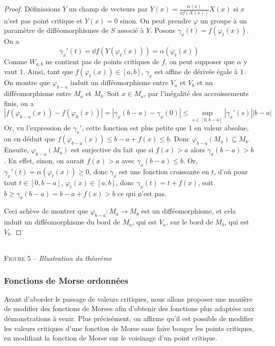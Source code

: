 \begin{proof}
    Définissions $Y$ un champ de vecteurs par $Y(x)=\frac{\alpha(x)}{\dd f(X(x))}X(x)$ si 
    $x$ n'est pas point critique et $Y(x)=0$ sinon.
    On peut prendre $\varphi$ un groupe à un paramètre de difféomorphismes de $S$ associé à 
    $Y$. 
    Posons $\gamma_x(t)=f(\varphi_t(x))$.
    On a 
    \[
        \gamma_x'(t)=\dd f(Y(\varphi_t(x)))=\alpha(\varphi_t(x))
    \]
    Comme $W_{a,b}$ ne contient pas de points critiques de $f$, on peut supposer que $\alpha$ 
    y vaut $1$.
    Ainsi, tant que $f(\varphi_t(x))\in[a,b]$, $\gamma_x$ est affine de dérivée égale à $1$.
    On montre que $\varphi_{b-a}$ induit un difféomorphisme entre $V_a$ et $V_b$ et un 
    difféomorphisme entre $M_a$ et $M_b$. 
    Soit $x\in M_a$, par l'inégalité des accroissements finis, on a 
    \[
        |f(\varphi_{b-a}(x))-f(\varphi_0(x))|=
        |\gamma_x(b-a)-\gamma_x(0)|\leq \sup_{s\in[0,b-a]}|\gamma_x'(s)||b-a|
    \]
    Or, vu l'expression de $\gamma_x'$, cette fonction est plus petite que $1$ en valeur absolue, 
    on en déduit que $f(\varphi_{b-a}(x))\leq b-a+f(x)\leq b$.
    Donc $\varphi_{b-a}(M_a)\subseteq M_b$. 
    Ensuite, $\varphi_{b-a}(M_a)$ est surjective du fait que si $f(x)>a$ alors $\gamma_x(b-a)>b$. 
    En effet, sinon, on aurait $f(x)>a$ avec $\gamma_x(b-a)\leq b$. 
    Or, $\gamma_x'(t)=\alpha(\varphi_t(x))\geq 0$,
    donc $\gamma_x$ est une fonction croissante en $t$, d'où pour tout $t\in[0,b-a]$, 
    $\varphi_t(x)\in[a,b]$, donc $\gamma_x(t)=t+f(x)$, soit $b\geq \gamma_x(b-a)=b-a+f(x)>b$ 
    ce qui n'est pas.

    Ceci achève de montrer que $\varphi_{b-a}:M_a\to M_b$ est un difféomorphisme, et cela 
    induit un difféomorphisme du bord de $M_a$, qui est $V_a$, sur le bord de $M_b$, qui est $V_b$.
\end{proof}

\begin{center}
    \\
    \textsc{Figure 5} – \textit{Illustration du théorème}
\end{center}

\subsubsection{Fonctions de Morse ordonnées}

Avant d'aborder le passage de valeurs critiques, nous allons proposer 
une manière de modifier des fonctions de Morses afin d'obtenir des
fonctions plus adaptées aux démonstrations à venir. 
Plus précisément, on affirme qu'il est possible de modifier les valeurs
critiques d'une fonction de Morse sans faire bouger les points critiques,
en modifiant la fonction de Morse sur le voisinage d'un point critique.

